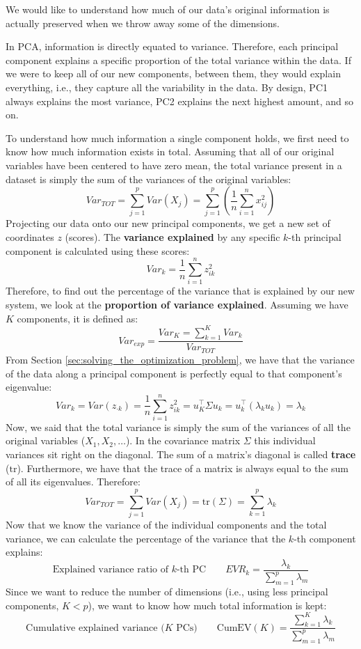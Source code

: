 We would like to understand how much of our data's original information is actually preserved when we throw away some of the dimensions.

In PCA, information is directly equated to variance. Therefore, each principal component explains a specific proportion of the total variance within the data. If we were to keep all of our new components, between them, they would explain everything, i.e., they capture all the variability in the data. By design, PC1 always explains the most variance, PC2 explains the next highest amount, and so on.

To understand how much information a single component holds, we first need to know how much information exists in total. Assuming that all of our original variables have been centered to have zero mean, the total variance present in a dataset is simply the sum of the variances of the original variables:
$$
Var_{TOT} = \sum_{j = 1}^p Var(X_j) = \sum_{j = 1}^p \left( \frac 1 n \sum_{i = 1}^n x_{ij}^2 \right)
$$
Projecting our data onto our new principal components, we get a new set of coordinates $z$ (scores). The \textbf{variance explained} by any specific $k$-th principal component is calculated using these scores:
$$
Var_k = \frac 1 n \sum_{i = 1}^n z_{ik}^2
$$
Therefore, to find out the percentage of the variance that is explained by our new system, we look at the \textbf{proportion of variance explained}. Assuming we have $K$ components, it is defined as:
$$
Var_{exp} = \frac{Var_K = \sum_{k = 1}^K Var_k}{Var_{TOT}}
$$
From Section \ref{sec:solving_the_optimization_problem}, we have that the variance of the data along a principal component is perfectly equal to that component's eigenvalue:
$$
Var_k
=
Var(z_{\cdot k})
=
\frac 1 n \sum_{i = 1}^n z_{ik}^2
=
u_K^\top \Sigma u_k
=
u_k^\top (\lambda_k u_k)
=
\lambda_k
$$
Now, we said that the total variance is simply the sum of the variances of all the original variables ($X_1, X_2, \dots$). In the covariance matrix $\Sigma$ this individual variances sit right on the diagonal. The sum of a matrix's diagonal is called \textbf{trace} ($\mathrm{tr}$). Furthermore, we have that the trace of a matrix is always equal to the sum of all its eigenvalues. Therefore:
$$
Var_{TOT} = \sum_{j = 1}^p Var(X_j) = \mathrm{tr}(\Sigma) = \sum_{k = 1}^p \lambda_k
$$
Now that we know the variance of the individual components and the total variance, we can calculate the percentage of the variance that the $k$-th component explains:
$$
\text{Explained variance ratio of $k$-th PC} \qquad EVR_k = \frac{\lambda_k}{\sum_{m = 1}^p \lambda_m}
$$
Since we want to reduce the number of dimensions (i.e., using less principal components, $K < p$), we want to know how much total information is kept:
$$
\text{Cumulative explained variance ($K$ PCs)} \qquad \mathrm{CumEV}(K)= \frac{\sum_{k = 1}^K \lambda_k}{\sum_{m = 1}^p \lambda_m}
$$


